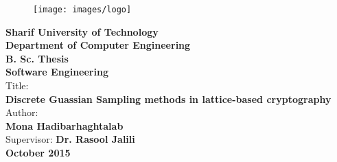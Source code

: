 \clearpage
\thispagestyle{empty}
\begin{latin}
\vspace*{-2cm}
\begin{figure}
\centerline{\texttt{[image: images/logo]}}
\end{figure}
\vspace{0.5cm}
\begin{center}
{\large\bf  Sharif University of Technology  }\\
{\large \bf  Department of Computer Engineering}\\
\vspace{0.2cm}
{\large\bf  B. Sc. Thesis  }\\
{\large \bf  Software Engineering}\\
\vspace{1cm}
Title:\\
{\Huge \bf Discrete Guassian Sampling methods in lattice-based cryptography}\vspace{0.5cm}\\
Author:\vspace{0.3cm}\\
{\LARGE  \bf Mona Hadibarhaghtalab}\\
\vspace{0.5cm}
Supervisor: {\Large \bf Dr. Rasool Jalili
}\\
\vspace{1cm}
{\large \bf October 2015}
\end{center}
\end{latin}
